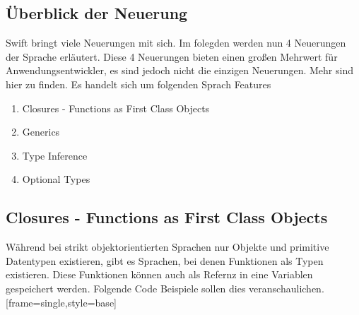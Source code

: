 \subsection{Überblick der Neuerung}
Swift bringt viele Neuerungen mit sich. Im folegden werden nun 4 Neuerungen der Sprache erläutert. Diese 4 Neuerungen bieten einen großen Mehrwert für Anwendungsentwickler, es sind jedoch nicht die einzigen Neuerungen. Mehr sind hier\cite{tre} zu finden. Es handelt sich um folgenden Sprach Features

\begin{enumerate}
\item Closures - Functions as First Class Objects
\item Generics
\item Type Inference
\item Optional Types
\end{enumerate}

\subsection{Closures - Functions as First Class Objects}
Während bei strikt objektorientierten Sprachen nur Objekte und primitive Datentypen existieren, gibt es Sprachen, bei denen Funktionen als Typen existieren. Diese Funktionen können auch als Refernz in eine Variablen gespeichert werden. Folgende Code Beispiele sollen dies veranschaulichen.
\lstset{style=base, language=Java, caption=Descriptive Caption Text, label=DescriptiveLabel}
\lstset{frame=shadowbox}
	[frame=single,style=base]
	

